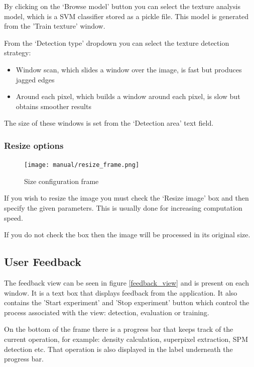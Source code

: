 \documentclass[12pt]{report}
\begin{document}
	By clicking on the ‘Browse model’ button you can select the texture analysis model, which is a SVM classifier stored as a pickle file. This model is generated from the 'Train texture' window.
	
	From the ‘Detection type’ dropdown you can select the texture detection strategy:
	\begin{itemize}
		\item Window scan, which slides a window over the image, is fast but produces jagged edges
		\item Around each pixel, which builds a window around each pixel, is slow but obtains smoother results
	\end{itemize}
	
	The size of these windows is set from the ‘Detection area’ text field.
	
	\subsubsection{Resize options}
	
	\begin{figure}
		\begin{center}
			\texttt{[image: manual/resize\_frame.png]}
		\end{center}
		\caption{Size configuration frame}
	\end{figure}
	
	If you wish to resize the image you must check the ‘Resize image’ box and then specify the given parameters. This is usually done for increasing computation speed.
	
	If you do not check the box then the image will be processed in its original size.
	
	\subsection{User Feedback}
	
	The feedback view can be seen in figure \ref{feedback_view} and is present on each window. It is a text box that displays feedback from the application. It also contains the 'Start experiment' and 'Stop experiment' button which control the process associated with the view: detection, evaluation or training.
	
	On the bottom of the frame there is a progress bar that keeps track of the current operation, for example: density calculation, superpixel extraction, SPM detection etc. That operation is also displayed in the label underneath the progress bar.
	
\end{document}
